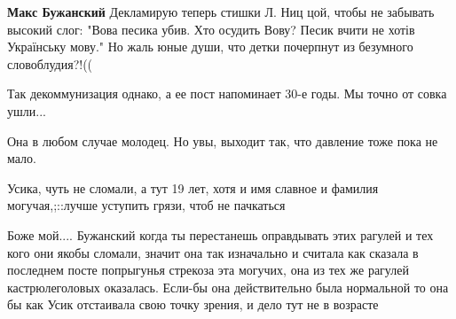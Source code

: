 \begin{itemize}
\begin{itemize}
\textbf{Макс Бужанский} Декламирую теперь стишки Л. Ниц цой, чтобы не забывать высокий слог:
"Вова песика убив.
Хто осудить Вову?
Песик вчити не хотів
Українську мову." Но жаль юные души, что детки почерпнут из безумного словоблудия?!((
\end{itemize}

 
Так декоммунизация однако, а ее пост напоминает 30-е годы. Мы точно от совка ушли...

 
Она в любом случае молодец. Но увы, выходит так, что давление тоже пока не мало.

 
Усика, чуть не сломали, а тут 19 лет, хотя и имя славное и фамилия могучая,;::лучше уступить грязи, чтоб не пачкаться

 

Боже мой.... Бужанский когда ты перестанешь оправдывать этих рагулей и тех кого
они якобы сломали, значит она так изначально и считала как сказала в последнем
посте попрыгунья стрекоза эта могучих, она из тех же рагулей кастрюлеголовых
оказалась. Если-бы она действительно была нормальной то она бы как Усик
отстаивала свою точку зрения, и дело тут не в возрасте

\begin{itemize}
 

\end{itemize}
\end{itemize}
